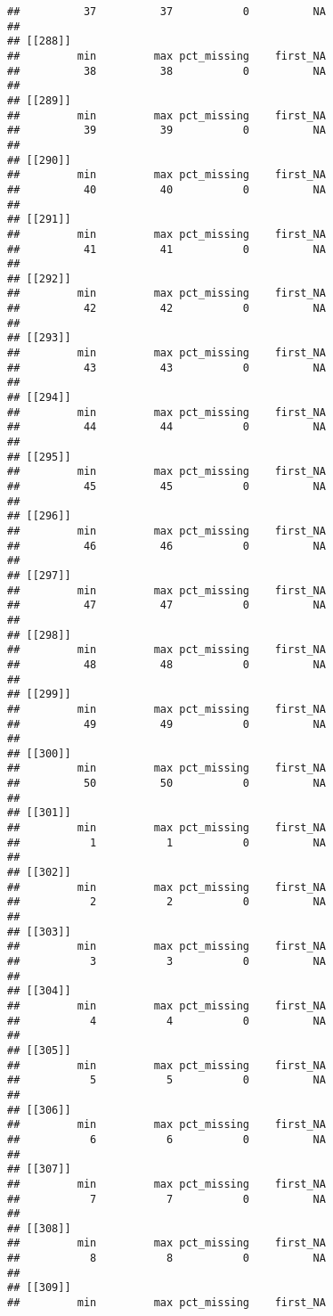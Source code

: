 \documentclass[
]{article}
\begin{document}
\begin{verbatim}
##          37          37           0          NA 
## 
## [[288]]
##         min         max pct_missing    first_NA 
##          38          38           0          NA 
## 
## [[289]]
##         min         max pct_missing    first_NA 
##          39          39           0          NA 
## 
## [[290]]
##         min         max pct_missing    first_NA 
##          40          40           0          NA 
## 
## [[291]]
##         min         max pct_missing    first_NA 
##          41          41           0          NA 
## 
## [[292]]
##         min         max pct_missing    first_NA 
##          42          42           0          NA 
## 
## [[293]]
##         min         max pct_missing    first_NA 
##          43          43           0          NA 
## 
## [[294]]
##         min         max pct_missing    first_NA 
##          44          44           0          NA 
## 
## [[295]]
##         min         max pct_missing    first_NA 
##          45          45           0          NA 
## 
## [[296]]
##         min         max pct_missing    first_NA 
##          46          46           0          NA 
## 
## [[297]]
##         min         max pct_missing    first_NA 
##          47          47           0          NA 
## 
## [[298]]
##         min         max pct_missing    first_NA 
##          48          48           0          NA 
## 
## [[299]]
##         min         max pct_missing    first_NA 
##          49          49           0          NA 
## 
## [[300]]
##         min         max pct_missing    first_NA 
##          50          50           0          NA 
## 
## [[301]]
##         min         max pct_missing    first_NA 
##           1           1           0          NA 
## 
## [[302]]
##         min         max pct_missing    first_NA 
##           2           2           0          NA 
## 
## [[303]]
##         min         max pct_missing    first_NA 
##           3           3           0          NA 
## 
## [[304]]
##         min         max pct_missing    first_NA 
##           4           4           0          NA 
## 
## [[305]]
##         min         max pct_missing    first_NA 
##           5           5           0          NA 
## 
## [[306]]
##         min         max pct_missing    first_NA 
##           6           6           0          NA 
## 
## [[307]]
##         min         max pct_missing    first_NA 
##           7           7           0          NA 
## 
## [[308]]
##         min         max pct_missing    first_NA 
##           8           8           0          NA 
## 
## [[309]]
##         min         max pct_missing    first_NA 

\end{verbatim}
\end{document}
